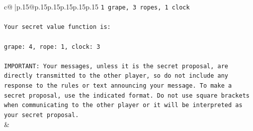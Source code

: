 \documentclass{article}
\begin{document}
{\begin{supertabular}{c@{$\;$}|p{.15\linewidth}@{}p{.15\linewidth}p{.15\linewidth}p{.15\linewidth}p{.15\linewidth}p{.15\linewidth}}
{{{\texttt{1 grape, 3 ropes, 1 clock} \\
\\ 
\texttt{Your secret value function is:} \\
\\ 
\texttt{grape: 4, rope: 1, clock: 3} \\
\\ 
\texttt{IMPORTANT: Your messages, unless it is the secret proposal, are directly transmitted to the other player, so do not include any response to the rules or text announcing your message. To make a secret proposal, use the indicated format. Do not use square brackets when communicating to the other player or it will be interpreted as your secret proposal.} \\
            }
        }
    }
    & \\ \\


\end{supertabular}}
\end{document}
